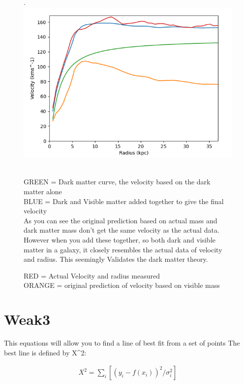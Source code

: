 \documentclass[10pt, twocolumn, twoside]{article}
\begin{document}
\begin{figure}[ht] .
\includegraphics[width=\columnwidth]{captureWEAK2.png}
\caption[width=\columnwidth]{RED = Actual Velocity and radius measured \\
ORANGE = original prediction of velocity based on visible mass} \\
GREEN = Dark matter curve, the velocity based on the dark matter alone \\
BLUE = Dark and Visible matter added together to give the final velocity \\
As you can see the original prediction based on actual mass and dark matter mass don't get the same velocity
as the actual data. However when you add these together, so both dark and visible matter in a galaxy, it closely
resembles the actual data of velocity and radius. This seemingly Validates the dark matter theory.

\end{figure}

\section{Weak3}
This equations will allow you to find a line of best fit from a set of points The best line is defined by X^2:

\begin{equation*}
\label{GaussE}
\begin{aligned}
X^2=\sum_{i}^{}[(y_i-f(x_i))^2/\sigma_i^2]
\end{aligned}
\end{equation*}
\end{document}

